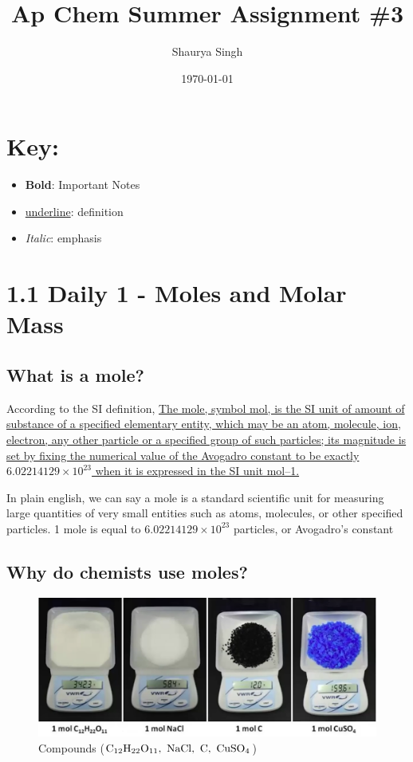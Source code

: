 \documentclass{scrartcl}
\author{Shaurya Singh}
\date{\today}
\title{Ap Chem Summer Assignment \#3}
\begin{document}
\maketitle

\section{Key:}
\label{sec:org10132d3}
\begin{itemize}
\item \textbf{Bold}: Important Notes
\item \uline{underline}: definition
\item \emph{Italic}: emphasis
\end{itemize}

\section{1.1 Daily 1 - Moles and Molar Mass}
\label{sec:org5eb3711}
\subsection{What is a mole?}
\label{sec:orgb27f1c2}
According to the SI definition, \uline{The mole, symbol mol, is the SI unit of amount of substance of a specified elementary entity, which may be an atom, molecule, ion, electron, any other particle or a specified group of such particles; its magnitude is set by fixing the numerical value of the Avogadro constant to be exactly \(6.02214129 × 10^{23}\) when it is expressed in the SI unit mol–1.}

In plain english, we can say a mole is a standard scientific unit for measuring
large quantities of very small entities such as atoms, molecules, or other
specified particles. 1 mole is equal to \(6.02214129 × 10^{23}\) particles, or
Avogadro's constant

\subsection{Why do chemists use moles?}
\label{sec:org6a12c65}
\begin{figure}[htbp]
\centering
\includegraphics[width=.9\linewidth]{./images/Diagram1.png}
\caption{\label{fig:1}Compounds (\(\ce{C12H22O11},\ \ce{NaCl},\ \ce{C},\ \ce{CuSO4}\))}
\end{figure}
\end{document}
